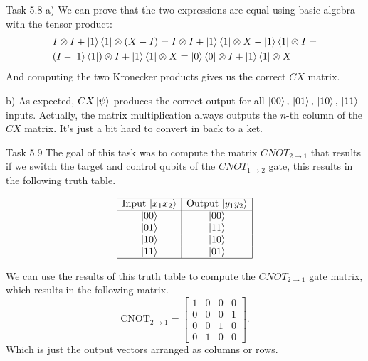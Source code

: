 \documentclass[aspectratio=169]{beamer}
\begin{document}
\begin{frame}{Task 5.8}
  a) We can prove that the two expressions are equal using basic algebra with the tensor product:
\begin{align*}
  &I \otimes I + \ket{1}\bra{1} \otimes (X - I) =
  I \otimes I + \ket{1}\bra{1} \otimes X - \ket{1}\bra{1} \otimes I = \\
  &(I - \ket{1}\bra{1}) \otimes I + \ket{1}\bra{1} \otimes X =
  \ket{0}\bra{0} \otimes I + \ket{1}\bra{1} \otimes X
\end{align*}
  And computing the two Kronecker products gives us the correct $CX$ matrix.
  \vspace{0.5cm}

  b) As expected, \(CX \ket{\psi}\) produces the correct output for all \(\ket{00},\, \ket{01},\, \ket{10},\, \ket{11}\) inputs. Actually, the matrix multiplication always outputs the $n$-th column of the $CX$ matrix. It's just a bit hard to convert in back to a ket.
\end{frame}

\begin{frame}{Task 5.9}
  The goal of this task was to compute the matrix $CNOT_{2 \to 1}$ that results if we switch the target and control qubits of the $CNOT_{1 \to 2}$ gate, this results in the following truth table.

\[
\begin{array}{|c|c|}
\hline
\text{Input } |x_1 x_2\rangle & \text{Output } |y_1 y_2\rangle \\
\hline
|00\rangle & |00\rangle \\
|01\rangle & |11\rangle \\
|10\rangle & |10\rangle \\
|11\rangle & |01\rangle \\
\hline
\end{array}
\]

We can use the results of this truth table to compute the $CNOT_{2 \to 1}$ gate matrix, which results in the following matrix.
\[
\text{CNOT}_{2 \to 1} =
\begin{bmatrix}
1 & 0 & 0 & 0 \\
0 & 0 & 0 & 1 \\
0 & 0 & 1 & 0 \\
0 & 1 & 0 & 0
\end{bmatrix}.
\]
Which is just the output vectors arranged as columns or rows.
\end{frame}
\end{document}
